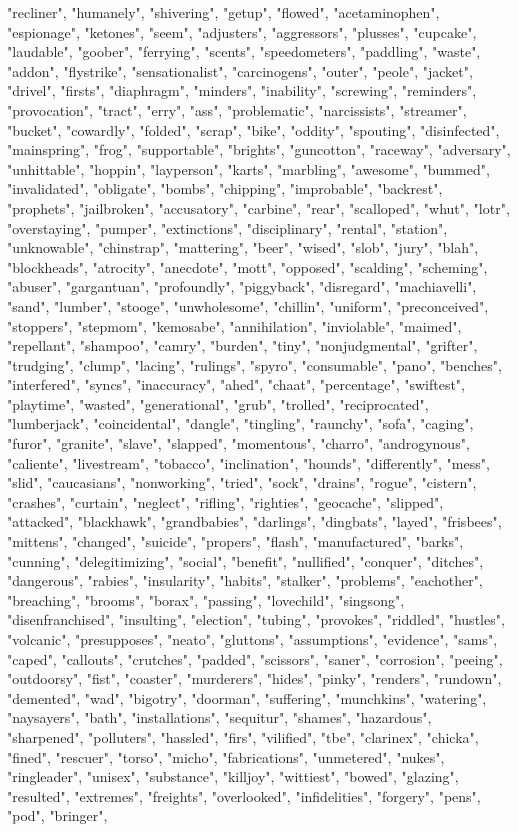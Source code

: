 "recliner", "humanely", "shivering", "getup", "flowed", "acetaminophen", "espionage", "ketones", "seem", "adjusters", "aggressors", "plusses", "cupcake", "laudable", "goober", "ferrying", "scents", "speedometers", "paddling", "waste", "addon", "flystrike", "sensationalist", "carcinogens", "outer", "peole", "jacket", "drivel", "firsts", "diaphragm", "minders", "inability", "screwing", "reminders", "provocation", "tract", "erry", "ass", "problematic", "narcissists", "streamer", "bucket", "cowardly", "folded", "scrap", "bike", "oddity", "spouting", "disinfected", "mainspring", "frog", "supportable", "brights", "guncotton", "raceway", "adversary", "unhittable", "hoppin", "layperson", "karts", "marbling", "awesome", "bummed", "invalidated", "obligate", "bombs", "chipping", "improbable", "backrest", "prophets", "jailbroken", "accusatory", "carbine", "rear", "scalloped", "whut", "lotr", "overstaying", "pumper", "extinctions", "disciplinary", "rental", "station", "unknowable", "chinstrap", "mattering", "beer", "wised", "slob", "jury", "blah", "blockheads", "atrocity", "anecdote", "mott", "opposed", "scalding", "scheming", "abuser", "gargantuan", "profoundly", "piggyback", "disregard", "machiavelli", "sand", "lumber", "stooge", "unwholesome", "chillin", "uniform", "preconceived", "stoppers", "stepmom", "kemosabe", "annihilation", "inviolable", "maimed", "repellant", "shampoo", "camry", "burden", "tiny", "nonjudgmental", "grifter", "trudging", "clump", "lacing", "rulings", "spyro", "consumable", "pano", "benches", "interfered", "syncs", "inaccuracy", "ahed", "chaat", "percentage", "swiftest", "playtime", "wasted", "generational", "grub", "trolled", "reciprocated", "lumberjack", "coincidental", "dangle", "tingling", "raunchy", "sofa", "caging", "furor", "granite", "slave", "slapped", "momentous", "charro", "androgynous", "caliente", "livestream", "tobacco", "inclination", "hounds", "differently", "mess", "slid", "caucasians", "nonworking", "tried", "sock", "drains", "rogue", "cistern", "crashes", "curtain", "neglect", "rifling", "righties", "geocache", "slipped", "attacked", "blackhawk", "grandbabies", "darlings", "dingbats", "layed", "frisbees", "mittens", "changed", "suicide", "propers", "flash", "manufactured", "barks", "cunning", "delegitimizing", "social", "benefit", "nullified", "conquer", "ditches", "dangerous", "rabies", "insularity", "habits", "stalker", "problems", "eachother", "breaching", "brooms", "borax", "passing", "lovechild", "singsong", "disenfranchised", "insulting", "election", "tubing", "provokes", "riddled", "hustles", "volcanic", "presupposes", "neato", "gluttons", "assumptions", "evidence", "sams", "caped", "callouts", "crutches", "padded", "scissors", "saner", "corrosion", "peeing", "outdoorsy", "fist", "coaster", "murderers", "hides", "pinky", "renders", "rundown", "demented", "wad", "bigotry", "doorman", "suffering", "munchkins", "watering", "naysayers", "bath", "installations", "sequitur", "shames", "hazardous", "sharpened", "polluters", "hassled", "firs", "vilified", "tbe", "clarinex", "chicka", "fined", "rescuer", "torso", "micho", "fabrications", "unmetered", "nukes", "ringleader", "unisex", "substance", "killjoy", "wittiest", "bowed", "glazing", "resulted", "extremes", "freights", "overlooked", "infidelities", "forgery", "pens", "pod", "bringer", 